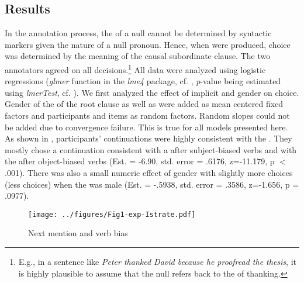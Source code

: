 \documentclass[output=paper,colorlinks,citecolor=brown]{langscibook}
\begin{document}
\subsection {Results} 
 In the annotation process, the  of a null  cannot be determined by syntactic markers given the nature of a null pronoun.  
Hence, when  were produced,  choice was determined by the meaning of the causal subordinate clause. The two annotators agreed on all decisions.\footnote{E.g., in a sentence like \textit{Peter thanked David because he proofread the thesis}, it is highly plausible to assume that the null  refers back to the  of thanking.} All data were analyzed using logistic regressions (\textit{glmer} function in the \textit{lme4} package, cf. \citealt{bates2015package}, \textit{p}-value being estimated using \textit{lmerTest}, cf.  \citealt{kuznetsova2017lmertest}). We first analyzed the effect of implicit  and gender on  choice. Gender of the  of the root clause as well as  were added as mean centered fixed factors and participants and items as random factors. Random slopes could not be added due to convergence failure. This is true for all models presented here. As shown in , participants’ continuations were highly consistent with the . They mostly chose a continuation consistent with a   after subject-biased verbs and with the   after object-biased verbs (Est. = -6.90, std. error = .6176, z=-11.179, p $<$$ $.001). There was also a small numeric effect of gender with slightly more  choices (less  choices) when the   was male (Est. = -.5938, std. error = .3586, z=-1.656, p = .0977).

\begin{figure}[h] 
\texttt{[image: ../figures/Fig1-exp-Istrate.pdf]}
\caption{Next mention and verb bias}
\label{object_ant:Istrate}
\end{figure}
\end{document}
